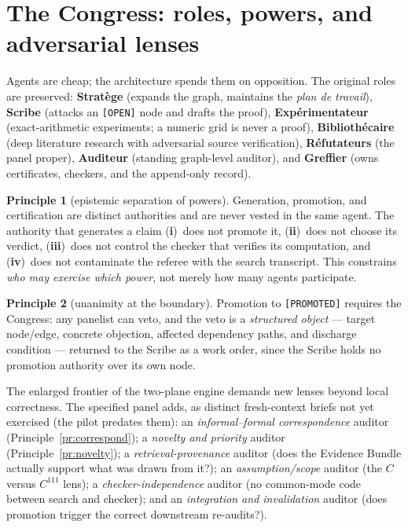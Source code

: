 \documentclass[11pt]{amsart}
\theoremstyle{definition}
\newtheorem{principle}{Principle}
\theoremstyle{remark}
\newcommand{\state}[1]{\texttt{[#1]}}
\begin{document}
\section{The Congress: roles, powers, and adversarial lenses}\label{sec:congress}

Agents are cheap; the architecture spends them on opposition. The original roles
are preserved: \textbf{Strat\`ege} (expands the graph, maintains the
\emph{plan de travail}), \textbf{Scribe} (attacks an \state{OPEN} node and
drafts the proof), \textbf{Exp\'erimentateur} (exact-arithmetic experiments; a
numeric grid is never a proof), \textbf{Biblioth\'ecaire} (deep literature
research with adversarial source verification), \textbf{R\'efutateurs} (the
panel proper), \textbf{Auditeur} (standing graph-level auditor), and
\textbf{Greffier} (owns certificates, checkers, and the append-only record).

\begin{principle}[epistemic separation of powers]\label{pr:sep}
Generation, promotion, and certification are distinct authorities and are never
vested in the same agent. The authority that generates a claim
(\textbf{i})~does not promote it, (\textbf{ii})~does not choose its verdict,
(\textbf{iii})~does not control the checker that verifies its computation, and
(\textbf{iv})~does not contaminate the referee with the search transcript. This
constrains \emph{who may exercise which power}, not merely how many agents
participate.
\end{principle}

\begin{principle}[unanimity at the boundary]\label{pr:veto}
Promotion to \state{PROMOTED} requires the Congress: any panelist can veto, and
the veto is a \emph{structured object} --- target node/edge, concrete objection,
affected dependency paths, and discharge condition --- returned to the Scribe as
a work order, since the Scribe holds no promotion authority over its own node.
\end{principle}

The enlarged frontier of the two-plane engine demands new lenses beyond local
correctness. The specified panel adds, as distinct fresh-context briefs not yet
exercised (the pilot predates them): an
\emph{informal--formal correspondence} auditor (Principle~\ref{pr:correspond});
a \emph{novelty and priority} auditor (Principle~\ref{pr:novelty}); a
\emph{retrieval-provenance} auditor (does the Evidence Bundle actually support
what was drawn from it?); an \emph{assumption/scope} auditor (the $C$ versus
$C^{111}$ lens); a \emph{checker-independence} auditor (no common-mode code
between search and checker); and an \emph{integration and invalidation} auditor
(does promotion trigger the correct downstream re-audits?).
\end{document}
